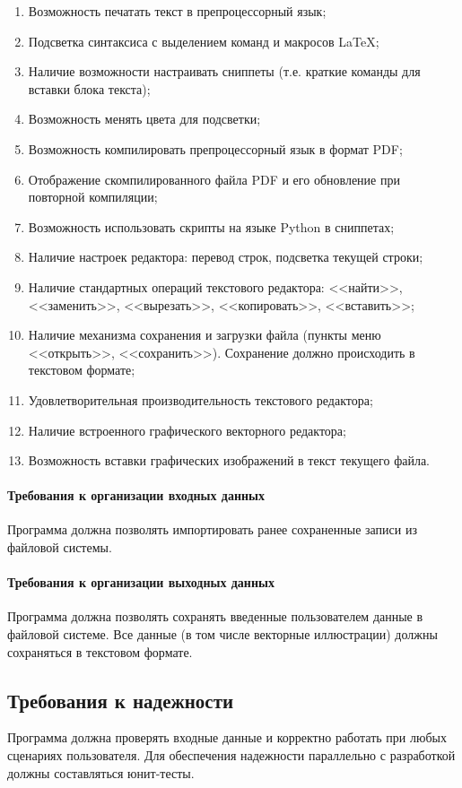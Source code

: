 \documentclass[techtask]{espd}
\begin{document}
\begin{enumerate}
\item Возможность печатать текст в препроцессорный язык;
\item Подсветка синтаксиса с выделением команд и макросов LaTeX;
\item Наличие возможности настраивать сниппеты (т.е. краткие команды для вставки блока текста);
\item Возможность менять цвета для подсветки;
\item Возможность компилировать препроцессорный язык в формат PDF;
\item Отображение скомпилированного файла PDF и его обновление при повторной компиляции;
\item Возможность использовать скрипты на языке Python в сниппетах;
\item Наличие настроек редактора: перевод строк, подсветка текущей строки;
\item Наличие стандартных операций текстового редактора: <<найти>>, <<заменить>>, <<вырезать>>, <<копировать>>, <<вставить>>;
\item Наличие механизма сохранения и загрузки файла (пункты меню <<открыть>>, <<сохранить>>). Сохранение должно происходить в текстовом формате;
\item Удовлетворительная производительность текстового редактора;
\item Наличие встроенного графического векторного редактора;
\item Возможность вставки графических изображений в текст текущего файла.
\end{enumerate}

\paragraph{Требования к организации входных данных}
Программа должна позволять импортировать ранее сохраненные записи из файловой системы.

\paragraph{Требования к организации выходных данных}
Программа должна позволять сохранять введенные пользователем данные в файловой системе. Все данные (в том числе векторные иллюстрации) должны сохраняться в текстовом формате.

\subsection{Требования к надежности}
Программа должна проверять входные данные и корректно работать при любых сценариях пользователя. Для обеспечения надежности параллельно с разработкой должны составляться юнит-тесты.
\end{document}
